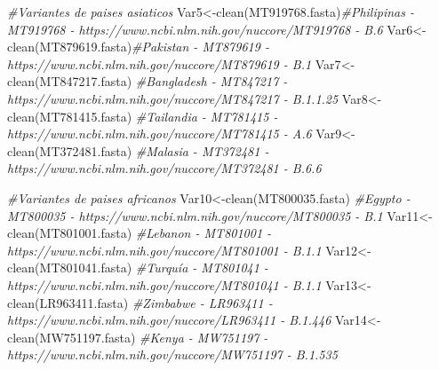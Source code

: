 \documentclass[
]{article}
\newenvironment{Shaded}{\begin{snugshade}}{\end{snugshade}}
\newcommand{\CommentTok}[1]{\textcolor[rgb]{0.56,0.35,0.01}{\textit{#1}}}
\newcommand{\FunctionTok}[1]{\textcolor[rgb]{0.00,0.00,0.00}{#1}}
\newcommand{\NormalTok}[1]{#1}
\newcommand{\OtherTok}[1]{\textcolor[rgb]{0.56,0.35,0.01}{#1}}
\newcommand{\StringTok}[1]{\textcolor[rgb]{0.31,0.60,0.02}{#1}}
\begin{document}
\begin{Shaded}
\begin{Highlighting}[]
\CommentTok{\#Variantes de paises asiaticos}
\NormalTok{Var5}\OtherTok{\textless{}{-}}\FunctionTok{clean}\NormalTok{(}\StringTok{\textquotesingle{}MT919768.fasta\textquotesingle{}}\NormalTok{)}\CommentTok{\#Philipinas {-} MT919768 {-} https://www.ncbi.nlm.nih.gov/nuccore/MT919768 {-} B.6}
\NormalTok{Var6}\OtherTok{\textless{}{-}}\FunctionTok{clean}\NormalTok{(}\StringTok{\textquotesingle{}MT879619.fasta\textquotesingle{}}\NormalTok{)}\CommentTok{\#Pakistan {-} MT879619 {-} https://www.ncbi.nlm.nih.gov/nuccore/MT879619 {-} B.1}
\NormalTok{Var7}\OtherTok{\textless{}{-}}\FunctionTok{clean}\NormalTok{(}\StringTok{\textquotesingle{}MT847217.fasta\textquotesingle{}}\NormalTok{) }\CommentTok{\#Bangladesh {-} MT847217 {-}  https://www.ncbi.nlm.nih.gov/nuccore/MT847217 {-} B.1.1.25}
\NormalTok{Var8}\OtherTok{\textless{}{-}}\FunctionTok{clean}\NormalTok{(}\StringTok{\textquotesingle{}MT781415.fasta\textquotesingle{}}\NormalTok{) }\CommentTok{\#Tailandia {-} MT781415 {-} https://www.ncbi.nlm.nih.gov/nuccore/MT781415 {-} A.6}
\NormalTok{Var9}\OtherTok{\textless{}{-}}\FunctionTok{clean}\NormalTok{(}\StringTok{\textquotesingle{}MT372481.fasta\textquotesingle{}}\NormalTok{) }\CommentTok{\#Malasia {-} MT372481 {-} https://www.ncbi.nlm.nih.gov/nuccore/MT372481 {-} B.6.6}

\CommentTok{\#Variantes de paises africanos}
\NormalTok{Var10}\OtherTok{\textless{}{-}}\FunctionTok{clean}\NormalTok{(}\StringTok{\textquotesingle{}MT800035.fasta\textquotesingle{}}\NormalTok{) }\CommentTok{\#Egypto {-} MT800035 {-} https://www.ncbi.nlm.nih.gov/nuccore/MT800035 {-} B.1}
\NormalTok{Var11}\OtherTok{\textless{}{-}}\FunctionTok{clean}\NormalTok{(}\StringTok{\textquotesingle{}MT801001.fasta\textquotesingle{}}\NormalTok{) }\CommentTok{\#Lebanon {-} MT801001 {-} https://www.ncbi.nlm.nih.gov/nuccore/MT801001 {-} B.1.1}
\NormalTok{Var12}\OtherTok{\textless{}{-}}\FunctionTok{clean}\NormalTok{(}\StringTok{\textquotesingle{}MT801041.fasta\textquotesingle{}}\NormalTok{) }\CommentTok{\#Turquía {-} MT801041 {-} https://www.ncbi.nlm.nih.gov/nuccore/MT801041 {-} B.1.1}
\NormalTok{Var13}\OtherTok{\textless{}{-}}\FunctionTok{clean}\NormalTok{(}\StringTok{\textquotesingle{}LR963411.fasta\textquotesingle{}}\NormalTok{) }\CommentTok{\#Zimbabwe {-} LR963411 {-} https://www.ncbi.nlm.nih.gov/nuccore/LR963411 {-} B.1.446}
\NormalTok{Var14}\OtherTok{\textless{}{-}}\FunctionTok{clean}\NormalTok{(}\StringTok{\textquotesingle{}MW751197.fasta\textquotesingle{}}\NormalTok{) }\CommentTok{\#Kenya {-} MW751197 {-} https://www.ncbi.nlm.nih.gov/nuccore/MW751197 {-} B.1.535}


\end{Highlighting}
\end{Shaded}
\end{document}
